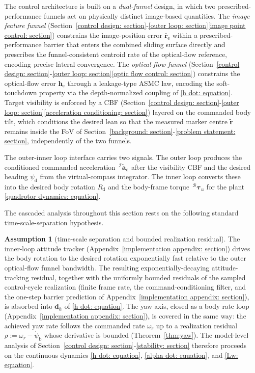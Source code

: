\documentclass{IEEEtaes}
\theoremstyle{definition}
\newtheorem{assumption}{Assumption}
\theoremstyle{remark}
\begin{document}
The control architecture is built on a \emph{dual-funnel} design, in which two prescribed-performance funnels act on physically distinct image-based quantities. The \emph{image feature funnel} (Section~\ref{control design: section}-\ref{outer loop: section}\ref{image point control: section}) constrains the image-position error $\bar{\boldsymbol{r}}_\text{e}$ within a prescribed-performance barrier that enters the combined sliding surface directly and prescribes the funnel-consistent centroid rate of the optical-flow reference, encoding precise lateral convergence. The \emph{optical-flow funnel} (Section~\ref{control design: section}-\ref{outer loop: section}\ref{optic flow control: section}) constrains the optical-flow error $\boldsymbol{h}_\text{e}$ through a leakage-type ASMC law, encoding the soft-touchdown property via the depth-normalized coupling of \eqref{h dot: equation}. Target visibility is enforced by a CBF (Section~\ref{control design: section}-\ref{outer loop: section}\ref{acceleration conditioning: section}) layered on the commanded body tilt, which conditions the desired lean so that the measured marker centre $\tilde{\boldsymbol{r}}$ remains inside the FoV of Section~\ref{background: section}-\ref{problem statement: section}, independently of the two funnels.

The outer-inner loop interface carries two signals. The outer loop produces the conditioned commanded acceleration $\,^\mathcal{I}\tilde{\boldsymbol{a}}_\text{d}$ after the visibility CBF and the desired heading $\psi_\text{d}$ from the virtual-compass integrator. The inner loop converts these into the desired body rotation $R_\text{d}$ and the body-frame torque $\,^\mathcal{B}\boldsymbol{\tau}_u$ for the plant \eqref{quadrotor dynamics: equation}.

The cascaded analysis throughout this section rests on the following standard time-scale-separation hypothesis.

\begin{assumption}[time-scale separation and bounded realization residual]\label{asm:timescale} The inner-loop attitude tracker (Appendix~\ref{implementation appendix: section}) drives the body rotation to the desired rotation exponentially fast relative to the outer optical-flow funnel bandwidth. The resulting exponentially-decaying attitude-tracking residual, together with the uniformly bounded residuals of the sampled control-cycle realization (finite frame rate, the command-conditioning filter, and the one-step barrier prediction of Appendix~\ref{implementation appendix: section}), is absorbed into $\boldsymbol{d}_h$ of \eqref{h dot: equation}. The yaw axis, closed as a body-rate loop (Appendix~\ref{implementation appendix: section}), is covered in the same way: the achieved yaw rate follows the commanded rate $\omega_r$ up to a realization residual $\rho:=\omega_r-\dot{\psi}_\text{b}$ whose derivative is bounded (Theorem~\ref{thm:yaw}). The model-level analysis of Section~\ref{control design: section}-\ref{stability: section} therefore proceeds on the continuous dynamics \eqref{h dot: equation}, \eqref{alpha dot: equation}, and \eqref{Lw: equation}.\end{assumption}
\end{document}
